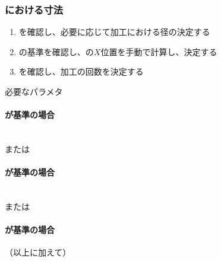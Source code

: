 \clearpage
\subsubsection{\KeywayMilling における寸法}
\begin{enumerate}[label=\sarrow]
\item \KeywayCornerType を確認し、必要に応じて加工における径の決定する
\item {}\nameKeywayCenter の基準を確認し、\KeywayCenter の$X$位置を手動で計算し、決定する
\item \KeywayWidth を確認し、加工の回数を決定する
\end{enumerate}
\begin{Parameter}{必要なパラメタ}
\paragraph*{\CenterCurvatureLine が基準の場合}
\PMKeywayACOD
\PMKeywayBDOD
\PMKeywayPos
\PMKeywayWidth
\PMCenterCurvatureRadius\\
\PMKeywayCornerR または\PMKeywayCornerC
\tcbline*
\paragraph*{\OutcutCenter が基準の場合}
\PMKeywayACOD
\PMKeywayBDOD
\PMKeywayPos
\PMKeywayWidth\\
\PMKeywayCornerR または\PMKeywayCornerC
\tcbline*
\paragraph*{\AsideKeywayDepth が基準の場合}
（以上に加えて）\PMAsideKeywayDepth
\end{Parameter}

\clearpage
